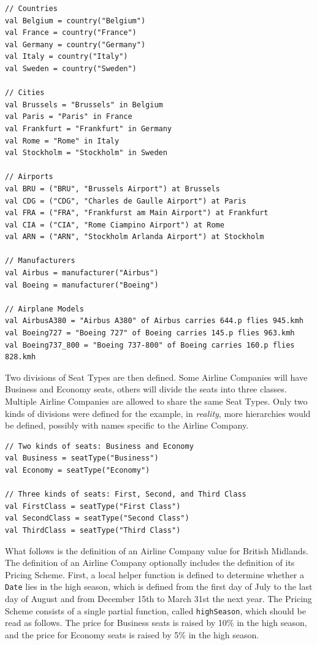 \documentclass[a4paper]{article}
\newcommand{\cc}[1]{\texttt{#1}}
\begin{document}
\begin{lstlisting}
// Countries
val Belgium = country("Belgium")
val France = country("France")
val Germany = country("Germany")
val Italy = country("Italy")
val Sweden = country("Sweden")

// Cities
val Brussels = "Brussels" in Belgium
val Paris = "Paris" in France
val Frankfurt = "Frankfurt" in Germany
val Rome = "Rome" in Italy
val Stockholm = "Stockholm" in Sweden

// Airports
val BRU = ("BRU", "Brussels Airport") at Brussels
val CDG = ("CDG", "Charles de Gaulle Airport") at Paris
val FRA = ("FRA", "Frankfurst am Main Airport") at Frankfurt
val CIA = ("CIA", "Rome Ciampino Airport") at Rome
val ARN = ("ARN", "Stockholm Arlanda Airport") at Stockholm

// Manufacturers
val Airbus = manufacturer("Airbus")
val Boeing = manufacturer("Boeing")

// Airplane Models
val AirbusA380 = "Airbus A380" of Airbus carries 644.p flies 945.kmh
val Boeing727 = "Boeing 727" of Boeing carries 145.p flies 963.kmh
val Boeing737_800 = "Boeing 737-800" of Boeing carries 160.p flies 828.kmh
\end{lstlisting}

Two divisions of Seat Types are then defined.
Some Airline Companies will have Business and Economy seats, others will divide the seats into three classes.
Multiple Airline Companies are allowed to share the same Seat Types.
Only two kinds of divisions were defined for the example, in \emph{reality}, more hierarchies would be defined, possibly with names specific to the Airline Company.

\begin{lstlisting}
// Two kinds of seats: Business and Economy
val Business = seatType("Business")
val Economy = seatType("Economy")

// Three kinds of seats: First, Second, and Third Class
val FirstClass = seatType("First Class")
val SecondClass = seatType("Second Class")
val ThirdClass = seatType("Third Class")
\end{lstlisting}

What follows is the definition of an Airline Company value for British Midlands.
The definition of an Airline Company optionally includes the definition of its Pricing Scheme.
First, a local helper function is defined to determine whether a \cc{Date} lies in the high season, which is defined from the first day of July to the last day of August and from December 15th to March 31st the next year.
The Pricing Scheme consists of a single partial function, called \cc{highSeason}, which should be read as follows.
The price for Business seats is raised by 10\% in the high season, and the price for Economy seats is raised by 5\% in the high season.
\end{document}
